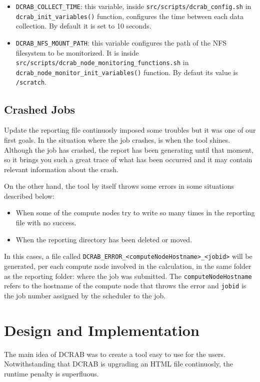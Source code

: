 \documentclass[10pt,a4paper]{report}
\begin{document}
\begin{itemize}
	\item \texttt{DCRAB\_COLLECT\_TIME}: this variable, inside \verb+src/scripts/dcrab_config.sh+ in \texttt{dcrab\_init\_variables()} function, configures the time between each data collection. By default it is set to 10 seconds.
	\item \texttt{DCRAB\_NFS\_MOUNT\_PATH}: this variable configures the path of the NFS filesystem to be monitorized. It is inside \verb+src/scripts/dcrab_node_monitoring_functions.sh+ in \texttt{dcrab\_node\_monitor\_init\_variables()} function. By defaut its value is \verb+/scratch+.
\end{itemize}

\section{Crashed Jobs}
\label{crash}
Update the reporting file continuosly imposed some troubles but it was one of our first goals. In the situation where the job crashes, is when the tool shines. Although the job has crashed, the report has been generating until that moment, so it brings you such a great trace of what has been occurred and it may contain relevant information about the crash.

On the other hand, the tool by itself throws some errors in some situations described below:

\begin{itemize}
	\item When some of the compute nodes try to write so many times in the reporting file with no success.
	\item When the reporting directory has been deleted or moved.
\end{itemize}

In this cases, a file called \verb+DCRAB_ERROR_<computeNodeHostname>_<jobid>+ will be generated, per each compute node involved in the calculation, in the same folder as the reporting folder: where the job was submitted. The \verb+computeNodeHostname+ refers to the hostname of the compute node that throws the error and \verb+jobid+ is the job number assigned by the scheduler to the job.


\chapter{Design and Implementation}

The main idea of DCRAB was to create a tool easy to use for the users. Notwithstanding that DCRAB is upgrading an HTML file continuosly, the runtime penalty is superfluous.
\end{document}
